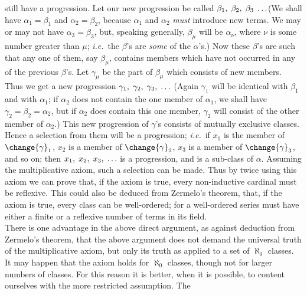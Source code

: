 {still have a progression. Let our new progression be called 
$\beta_1,\thickspace \beta_2,\thickspace \beta_3 \thickspace\ldots$\kksentencespace (We
shall
have $\alpha_1 = \beta_1$ and $\alpha_2 = \beta_2$, because 
$\alpha_1$ and $\alpha_2$ \textit{must} introduce
new terms. We may or may not 
have $\alpha_3 = \beta_3$,
but, speaking generally, $\beta_\mu$ will be $\alpha_\nu$, where 
\ensuremath{\nu} is
some number greater than \ensuremath{\mu}; \textit{i.e.}\ the \ensuremath{\beta}'s are
\textit{some} of the \ensuremath{\alpha}'s.) Now these \ensuremath{\beta}'s are such that
any
one of them, say $\beta_\mu$, contains members which have not occurred in
any of the previous
\ensuremath{\beta}'s. Let $\gamma_\mu$ be the part of 
$\beta_\mu$
which consists of new members. Thus we
get a new progression $\gamma_1,\thickspace \gamma_2,\thickspace \gamma_3,\thickspace \ldots$\kksentencespace
(Again $\gamma_1$ will be
identical
with $\beta_1$ and with $\alpha_1$; if $\alpha_2$
does not contain the one member of $\alpha_1$, we
shall have $\gamma_2 = \beta_2 = \alpha_2$,
but if $\alpha_2$ does contain this one member, 
$\gamma_2$
will consist of the other member of 
$\alpha_2$.) This
new progression of \ensuremath{\gamma}'s
consists of mutually exclusive classes. Hence a selection from them
will be a progression; \textit{i.e.}\ if $x_1$ is the member of 
\label{change:ygammas}$\change{\gamma}_1$,
$x_2$ is a
member of $\change{\gamma}_2$, $x_3$
is a member of $\change{\gamma}_3$, and so
on; then $x_1,\thickspace x_2,\thickspace
x_3,\thickspace{\ldots}$
is a progression, and is a sub-class of \ensuremath{\alpha}. Assuming the
multiplicative axiom, such a selection can be made. Thus by twice using
this axiom we can prove that, if the axiom is true, every non-inductive
cardinal must be reflexive. This could also be deduced from Zermelo's
theorem, that, if the axiom is true, every class can be \label{change:wellordered}well-ordered;
for a well-ordered series must have either a finite or a reflexive
number of terms in its field.\\
\indent There is one advantage in the above
direct argument, as
against
deduction from Zermelo's theorem, that the above argument does not
demand the universal truth of the multiplicative axiom, but only its
truth as applied to a set of $\aleph_0$ classes. It may
happen that the axiom holds for $\aleph_0$
classes, though not
for larger
numbers of classes. For this reason it is better, 
when   it is possible,
to content ourselves with the more restricted assumption. The
}
